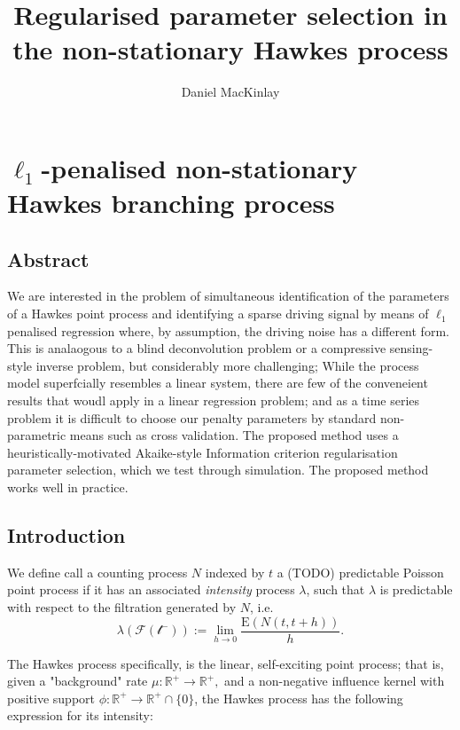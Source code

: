 \documentclass[11pt]{article}
\title{Regularised parameter selection in the non-stationary Hawkes process}
\author{Daniel MacKinlay}
\begin{document}
    
    
    \maketitle
    
    

    
    \section{$\ell_1$-penalised non-stationary Hawkes branching
process}\label{ellux5f1-penalised-non-stationary-hawkes-branching-process}





    \subsection{Abstract}\label{abstract}

We are interested in the problem of simultaneous identification of the
parameters of a Hawkes point process and identifying a sparse driving
signal by means of $\ell_1$ penalised regression where, by assumption,
the driving noise has a different form. This is analaogous to a blind
deconvolution problem or a compressive sensing-style inverse problem,
but considerably more challenging; While the process model superfcially
resembles a linear system, there are few of the conveneient results that
woudl apply in a linear regression problem; and as a time series problem
it is difficult to choose our penalty parameters by standard
non-parametric means such as cross validation. The proposed method uses
a heuristically-motivated Akaike-style Information criterion
regularisation parameter selection, which we test through simulation.
The proposed method works well in practice.

    \subsection{Introduction}\label{introduction}

We define call a counting process $N$ indexed by $t$ a (TODO)
predictable Poisson point process if it has an associated
\emph{intensity} process $\lambda$, such that $\lambda$ is predictable
with respect to the filtration generated by $N$, i.e.
\[\lambda(\mathcal{F(t^-)}):=\lim_{h\to 0} \frac{\mathrm E\left(N(t,t+h)\right)}{h}.\]

The Hawkes process \cite{hawkes_point_1971} specifically, is the linear,
self-exciting point process; that is, given a "background" rate
$\mu:\mathbb{R}^+\rightarrow\mathbb{R}^+,$ and a non-negative influence
kernel with positive support
$\phi:\mathbb{R}^+\rightarrow\mathbb{R}^+\cap\{0\}$, the Hawkes process
has the following expression for its intensity:
\end{document}
